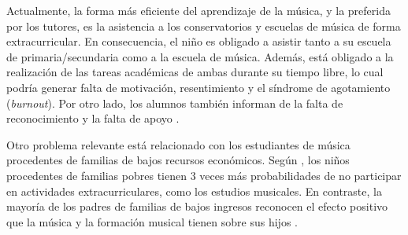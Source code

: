 %
%
%
%

Actualmente, la forma más eficiente del aprendizaje de la música, y la preferida por los tutores, es la asistencia a los conservatorios y escuelas de música de forma extracurricular. En consecuencia, el niño es obligado a asistir tanto a su escuela de primaria/secundaria como a la escuela de música. Además, está obligado a la realización de las tareas académicas de ambas durante su tiempo libre, lo cual podría generar falta de motivación, resentimiento y el síndrome de agotamiento (\textit{burnout}). Por otro lado, los alumnos también informan de la falta de reconocimiento y la falta de apoyo \citep{orzel-2010}.
\par Otro problema relevante está relacionado con los estudiantes de música procedentes de familias de bajos recursos económicos. Según \citet{busby-2019}, los niños procedentes de familias pobres tienen 3 veces más probabilidades de no participar en actividades extracurriculares, como los estudios musicales. En contraste, la mayoría de los padres de familias de bajos ingresos reconocen el efecto positivo que la música y la formación musical tienen sobre sus hijos \citep{ho-2020}.

